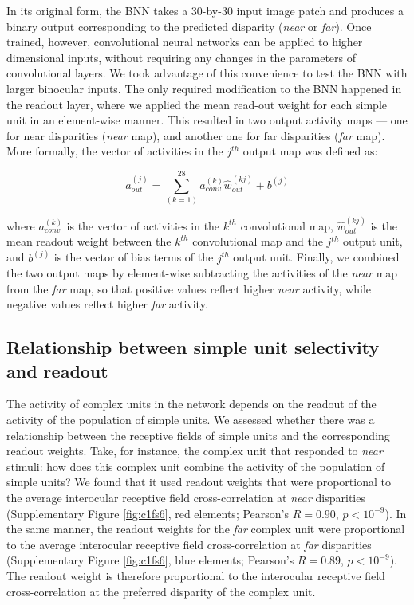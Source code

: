 In its original form, the BNN takes a 30-by-30 input image patch and produces a binary output corresponding to the predicted disparity ({\it near} or {\it far}). Once trained, however, convolutional neural networks can be applied to higher dimensional inputs, without requiring any changes in the parameters of convolutional layers. We took advantage of this convenience to test the BNN with larger binocular inputs. The only required modification to the BNN happened in the readout layer, where we applied the mean read-out weight for each simple unit in an element-wise manner. This resulted in two output activity maps --- one for near disparities ({\it near} map), and another one for far disparities ({\it far} map). More formally, the vector of activities in the $j^{th}$ output map was defined as:

\begin{equation}
  a_{out}^{(j)}= \sum_{(k=1)}^{28} a_{conv}^{(k)} \hat{w}_{out}^{(kj)} + b^{(j)}
\end{equation}

where $a_{conv}^{(k)}$ is the vector of activities in the $k^{th}$ convolutional map, $\hat{w}_{out}^{(kj)}$ is the mean readout weight between the $k^{th}$ convolutional map and the $j^{th}$ output unit, and $b^{(j)}$ is the vector of bias terms of the $j^{th}$ output unit. Finally, we combined the two output maps by element-wise subtracting the activities of the {\it near} map from the {\it far} map, so that positive values reflect higher {\it near} activity, while negative values reflect higher {\it far} activity.


\subsection*{Relationship between simple unit selectivity and readout}

The activity of complex units in the network depends on the readout of the activity of the population of simple units. We assessed whether there was a relationship between the receptive fields of simple units and the corresponding readout weights. Take, for instance, the complex unit that responded to \textit{near} stimuli: how does this complex unit combine the activity of the population of simple units? We found that it used readout weights that were proportional to the average interocular receptive field cross-correlation at \textit{near} disparities (Supplementary Figure \ref{fig:c1fs6}, red elements; Pearson's $R=0.90$, $p<10^{-9}$). In the same manner, the readout weights for the \textit{far} complex unit were proportional to the average interocular receptive field cross-correlation at \textit{far} disparities (Supplementary Figure \ref{fig:c1fs6}, blue elements; Pearson's $R=0.89$, $p<10^{-9}$). The readout weight is therefore proportional to the interocular receptive field cross-correlation at the preferred disparity of the complex unit.

